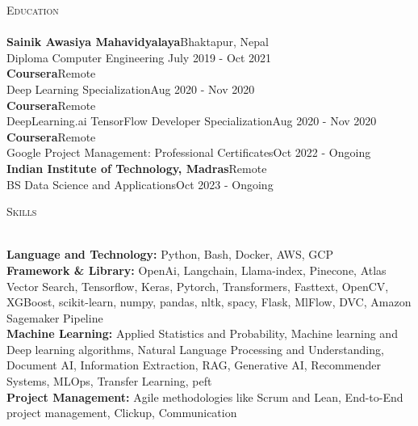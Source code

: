 \documentclass[a4paper]{article}
\newcommand{\lineunder} {
    \vspace*{-8pt} \\
    \hspace*{-18pt} \hrulefill \\
}
\newcommand{\header} [1] {
    {\hspace*{-18pt}\vspace*{6pt} \textsc{#1}}
    \vspace*{-6pt} \lineunder
}
\begin{document}
\header{Education}
\textbf{Sainik Awasiya Mahavidyalaya}\hfill Bhaktapur, Nepal\\
Diploma Computer Engineering \hfill July 2019 - Oct 2021\\
\vspace{2mm}
\textbf{Coursera}\hfill Remote\\
Deep Learning Specialization\hfill Aug 2020 - Nov 2020\\
\vspace{2mm}
\textbf{Coursera}\hfill Remote\\
DeepLearning.ai TensorFlow Developer Specialization\hfill Aug 2020 - Nov 2020\\
\vspace{2mm}
\textbf{Coursera}\hfill Remote\\
Google Project Management: Professional Certificates\hfill Oct 2022 - Ongoing\\
\vspace{2mm}
\textbf{Indian Institute of Technology, Madras}\hfill Remote\\
BS Data Science and Applications\hfill Oct 2023 - Ongoing\\
\vspace{4mm}

\header{Skills}
\small{\item{
    \textbf{Language and Technology:}{ Python, Bash, Docker, AWS, GCP \\}
    \textbf{Framework \& Library:}{ OpenAi, Langchain, Llama-index, Pinecone, Atlas Vector Search, Tensorflow, Keras, Pytorch,
    Transformers, Fasttext, OpenCV, XGBoost,
    scikit-learn, numpy, pandas, nltk, spacy, Flask, MlFlow, DVC,
    Amazon Sagemaker Pipeline \\}
    \textbf{Machine Learning:}{ Applied Statistics and Probability, Machine learning and Deep learning
    algorithms, Natural Language Processing and Understanding, Document AI,
    Information Extraction, RAG, Generative AI, Recommender Systems, MLOps,
    Transfer Learning, peft \\}
    \textbf{Project Management:}{ Agile methodologies like Scrum and Lean, End-to-End project management,
    Clickup, Communication \\}   
}
}
\vspace{2mm}
\end{document}

